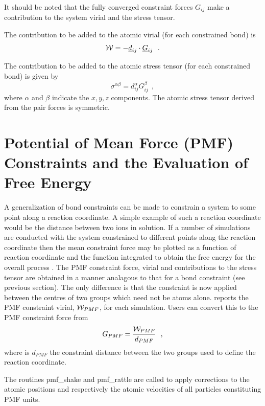 It should be noted that the fully converged constraint forces
$G_{ij}$ make a contribution to the system virial and the stress
tensor.

The contribution to be added to the atomic virial (for each
constrained bond) is
\begin{equation}
{\cal W} = -\mbox{$\underline{d}$}_{ij} \cdot \mbox{$\underline{G}$}_{ij}~~.
\end{equation}

The contribution to be added to the atomic stress
tensor (for each constrained bond) is given
by
\begin{equation}
\sigma^{\alpha \beta} = d_{ij}^{\alpha} G_{ij}^{\beta}~~,
\end{equation}
where $\alpha$ and $\beta$ indicate the $x,y,z$ components. The
atomic stress tensor derived from the pair forces is symmetric.

\section{Potential of Mean Force (PMF)
Constraints and the Evaluation of Free Energy}\label{pmf}

A generalization of bond constraints can be made to constrain
a system to some point along a reaction coordinate.  A simple
example of such a reaction coordinate would be the distance
between two ions in solution.  If a number of simulations are
conducted with the system constrained to different points along
the reaction coordinate then the mean constraint force may be
plotted as a function of reaction coordinate and the function
integrated to obtain the free energy for the overall process
\cite{mccammon-87a}.  The PMF constraint force, virial and
contributions to the stress tensor are obtained in a manner
analagous to that for a bond constraint (see previous section).
The only difference is that the constraint is now applied
between the centres of two groups which need not be atoms alone.
\D reports the PMF constraint virial, ${\cal W}_{PMF}$, for each
simulation.  Users can convert this to the PMF constraint force from
\begin{equation}
G_{PMF} = \frac {{\cal W}_{PMF}} {d_{PMF}}~~,
\end{equation}
where is $d_{PMF}$ the constraint distance between the two groups
used to define the reaction coordinate.

The routines {\sc pmf\_shake} and {\sc pmf\_rattle} are called to
apply corrections to the atomic positions and respectively the
atomic velocities of all particles constituting PMF units.

